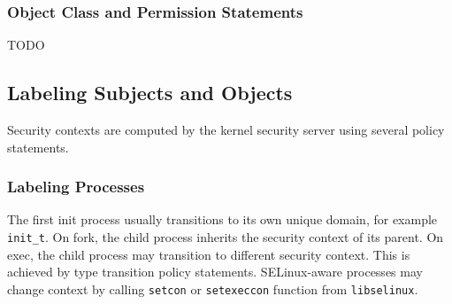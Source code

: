 \subsubsection{Object Class and Permission Statements}

TODO

\subsection{Labeling Subjects and Objects}

Security contexts are computed by the kernel security server using several
policy statements.

\subsubsection{Labeling Processes}
The first init process usually transitions to its own unique domain, for example
\texttt{init\_t}. On fork, the child process inherits the security context of
its parent. On exec, the child process may transition to different security
context. This is achieved by type transition policy statements. SELinux-aware
processes may change context by calling \texttt{setcon} or \texttt{setexeccon}
function from \texttt{libselinux}.

